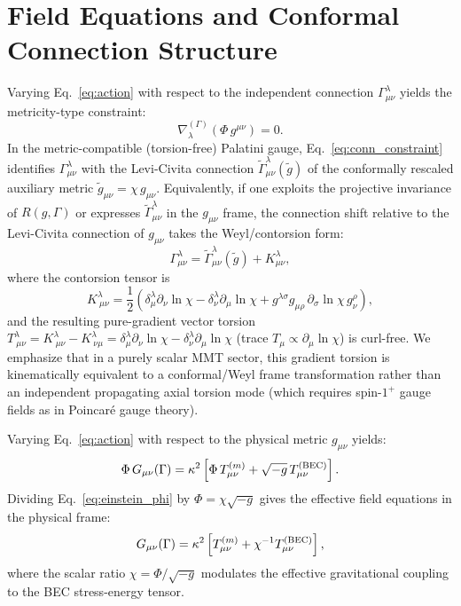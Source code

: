 \documentclass[preprint,12pt]{elsarticle}
\begin{document}
\section{Field Equations and Conformal Connection Structure}
\label{sec:field_eqs}

Varying Eq.~\eqref{eq:action} with respect to the independent connection $\Gamma^\lambda_{\mu\nu}$ yields the metricity-type constraint:
\begin{equation}
    \nabla^{(\Gamma)}_\lambda \left(\Phi\, g^{\mu\nu}\right) = 0.
    \label{eq:conn_constraint}
\end{equation}
In the metric-compatible (torsion-free) Palatini gauge, Eq.~\eqref{eq:conn_constraint} identifies $\Gamma^\lambda_{\mu\nu}$ with the Levi-Civita connection $\tilde{\Gamma}^\lambda_{\mu\nu}(\tilde{g})$ of the conformally rescaled auxiliary metric $\tilde{g}_{\mu\nu} = \chi\,g_{\mu\nu}$. Equivalently, if one exploits the projective invariance of $R(g,\Gamma)$ or expresses $\tilde{\Gamma}^\lambda_{\mu\nu}$ in the $g_{\mu\nu}$ frame, the connection shift relative to the Levi-Civita connection of $g_{\mu\nu}$ takes the Weyl/contorsion form:
\begin{equation}
    \Gamma^\lambda_{\mu\nu} = \tilde{\Gamma}^\lambda_{\mu\nu}(\tilde{g}) + K^\lambda_{\mu\nu},
    \label{eq:gamma_split}
\end{equation}
where the contorsion tensor is
\begin{equation}
    K^\lambda_{\ \mu\nu} = \frac{1}{2}\left(\delta^\lambda_\mu \partial_\nu \ln\chi - \delta^\lambda_\nu \partial_\mu \ln\chi + g^{\lambda\sigma}g_{\mu\rho}\,\partial_\sigma\ln\chi\,g^\rho_\nu\right),
    \label{eq:contorsion_def}
\end{equation}
and the resulting pure-gradient vector torsion $T^\lambda_{\ \mu\nu} = K^\lambda_{\ \mu\nu} - K^\lambda_{\ \nu\mu} = \delta^\lambda_\mu \partial_\nu \ln\chi - \delta^\lambda_\nu \partial_\mu \ln\chi$ (trace $T_\mu \propto \partial_\mu \ln\chi$) is curl-free. We emphasize that in a purely scalar MMT sector, this gradient torsion is kinematically equivalent to a conformal/Weyl frame transformation rather than an independent propagating axial torsion mode (which requires spin-$1^+$ gauge fields as in Poincar\'e gauge theory).

Varying Eq.~\eqref{eq:action} with respect to the physical metric $g_{\mu\nu}$ yields:
\begin{equation}
    \Phi\, G_{\mu\nu}(\Gamma) = \kappa^2 \left[ \Phi\, T^{(m)}_{\mu\nu} + \sqrt{-g}\, T^{\rm (BEC)}_{\mu\nu} \right].
    \label{eq:einstein_phi}
\end{equation}
Dividing Eq.~\eqref{eq:einstein_phi} by $\Phi = \chi\sqrt{-g}$ gives the effective field equations in the physical frame:
\begin{equation}
    G_{\mu\nu}(\Gamma) = \kappa^2 \left[ T^{(m)}_{\mu\nu} + \chi^{-1} T^{\rm (BEC)}_{\mu\nu} \right],
    \label{eq:einstein_phys}
\end{equation}
where the scalar ratio $\chi = \Phi/\sqrt{-g}$ modulates the effective gravitational coupling to the BEC stress-energy tensor.
\end{document}
